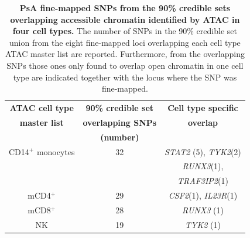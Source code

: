 \begin{table}[htbp]
\centering
\begin{tabular}{@{} c c c}
\toprule
\textbf{ATAC cell type} & \textbf{90\% credible set}   &  \textbf{Cell type specific}  \\
\textbf{master list}    & \textbf{overlapping SNPs}    &   \textbf{overlap}   \\
									      &	\textbf{(number)}				     &                            \\
\midrule
\midrule
 CD14$^+$ monocytes    & 32                            &  \textit{STAT2} (5), \textit{TYK2}(2)\\ 
                       &                               &  \textit{RUNX3}(1),\\
											 &                               &  \textit{TRAF3IP2}(1) \\
 mCD4$^+$              & 29                            &  \textit{CSF2}(1), \textit{IL23R}(1) \\
 mCD8$^+$              & 28                            &  \textit{RUNX3} (1)        \\
 NK                    & 19                            &  \textit{TYK2} (1)       \\
\bottomrule
\end{tabular}
\medskip %
\caption[PsA fine-mapped SNPs from the 90\% credible sets overlapping accessible chromatin identified by ATAC in four cell types.]{\textbf{PsA fine-mapped SNPs from the 90\% credible sets overlapping accessible chromatin identified by ATAC in four cell types.} The number of SNPs in the 90\% credible set union from the eight fine-mapped loci overlapping each cell type ATAC master list are reported. Furthermore, from the overlapping SNPs those ones only found to overlap open chromatin in one cell type are indicated together with the locus where the SNP was fine-mapped.}
\label{tab:PSA_fine_mapping_ATAC_overlap}
\end{table}


